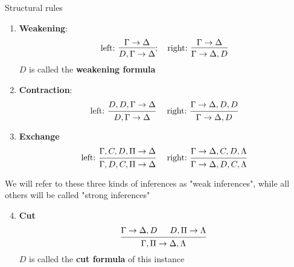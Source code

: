 \documentclass[11pt]{article}
\begin{document}
Structural rules
\begin{enumerate}
\item \textbf{Weakening}:
\begin{equation*}
\text{left: }
\begin{prooftree}
\hypo{\Gamma\to\Delta}
\infer1{D,\Gamma\to\Delta}
\end{prooftree};\quad\text{right: }
\begin{prooftree}
\hypo{\Gamma\to\Delta}
\infer1{\Gamma\to\Delta,D}
\end{prooftree}
\end{equation*}
\(D\) is called the \textbf{weakening formula}
\item \textbf{Contraction}:
\begin{equation*}
\text{left: }
\begin{prooftree}
\hypo{D,D,\Gamma\to\Delta}
\infer1{D,\Gamma\to\Delta}
\end{prooftree}\quad\text{ right: }
\begin{prooftree}
\hypo{\Gamma\to\Delta,D,D}
\infer1{\Gamma\to\Delta,D}
\end{prooftree}
\end{equation*}
\item \textbf{Exchange}
\begin{equation*}
\text{left: }
\begin{prooftree}
\hypo{\Gamma,C,D,\Pi\to\Delta}
\infer1{\Gamma,D,C,\Pi\to\Delta}
\end{prooftree}\quad\text{ right: }
\begin{prooftree}
\hypo{\Gamma\to\Delta,C,D,\Lambda}
\infer1{\Gamma\to\Delta,D,C,\Lambda}
\end{prooftree}
\end{equation*}
\end{enumerate}


We will refer to these three kinds of inferences as "weak inferences",
while all others will be called "strong inferences"
\begin{enumerate}
\setcounter{enumi}{3}
\item \textbf{Cut}
\begin{equation*}
\begin{prooftree}[center=false]
\hypo{\Gamma\to\Delta,D}
\hypo{D,\Pi \to\Lambda}
\infer2{\Gamma,\Pi\to\Delta,\Lambda}
\end{prooftree}
\end{equation*}
\(D\) is called the \textbf{cut formula} of this instance
\end{enumerate}
\end{document}
